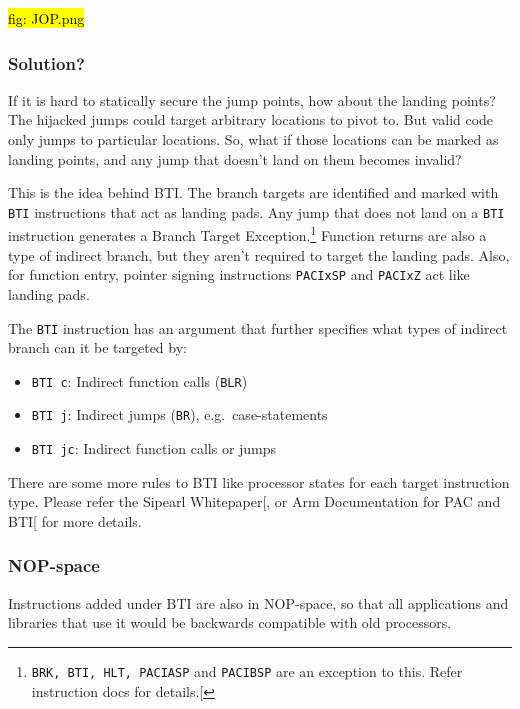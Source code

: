 \documentclass[a4paper, nobind]{templates/ociamthesis}
\providecommand{\tightlist}{%
  \setlength{\itemsep}{0pt}\setlength{\parskip}{0pt}}
\begin{document}
\hl{fig: JOP.png}

\subsubsection{Solution?}\label{solution-1}

If it is hard to statically secure the jump points, how about the landing points?
The hijacked jumps could target arbitrary locations to pivot to.
But valid code only jumps to particular locations. So, what if those locations
can be marked as landing points, and any jump that doesn't land on them becomes invalid?

This is the idea behind BTI. The branch targets are identified and marked with \texttt{BTI}
instructions that act as landing pads. Any jump that does not land on a \texttt{BTI} instruction
generates a Branch Target Exception.\footnote{\texttt{BRK,\ BTI,\ HLT,\ PACIASP} and \texttt{PACIBSP} are an exception to this.
  Refer instruction docs for details.{[}\citeproc{ref-armasm-user-guide}{4}{]}}
Function returns are also a type of indirect branch, but they aren't required
to target the landing pads. Also, for function entry,
pointer signing instructions \texttt{PACIxSP} and \texttt{PACIxZ} act like landing pads.

The \texttt{BTI} instruction has an argument that further specifies what types of indirect branch can it be targeted by:

\begin{itemize}
\tightlist
\item
  \texttt{BTI\ c}: Indirect function calls (\texttt{BLR})
\item
  \texttt{BTI\ j}: Indirect jumps (\texttt{BR}), e.g.~case-statements
\item
  \texttt{BTI\ jc}: Indirect function calls or jumps
\end{itemize}

There are some more rules to BTI like processor states for each target instruction type.
Please refer the Sipearl Whitepaper{[}\citeproc{ref-sipearl}{24}{]}, or Arm Documentation for PAC and BTI{[}\citeproc{ref-arm-pacbti}{5}{]} for more details.

\subsubsection{NOP-space}\label{nop-space}

Instructions added under BTI are also in NOP-space, so that all applications and
libraries that use it would be backwards compatible with old processors.
\end{document}
